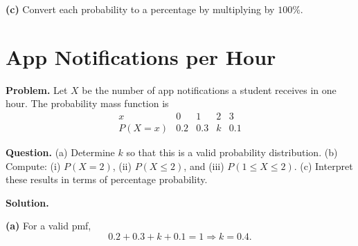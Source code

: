 		\textbf{(c)} Convert each probability to a percentage by multiplying by $100\%$.
		
		\section{App Notifications per Hour}
		
		\textbf{Problem.}
		Let $X$ be the number of app notifications a student receives in one hour. The probability mass function is
		\[
		\begin{array}{c|cccc}
			x & 0 & 1 & 2 & 3\\
			\hline
			P(X=x) & 0.2 & 0.3 & k & 0.1
		\end{array}
		\]
		
		\textbf{Question.}
		(a) Determine $k$ so that this is a valid probability distribution.
		(b) Compute: (i) $P(X=2)$, (ii) $P(X\le 2)$, and (iii) $P(1\le X\le 2)$.
		(c) Interpret these results in terms of percentage probability.
		
		\textbf{Solution.}

		\textbf{(a)} For a valid pmf,
		\[
		0.2+0.3+k+0.1=1\Rightarrow k=0.4.
		\]

